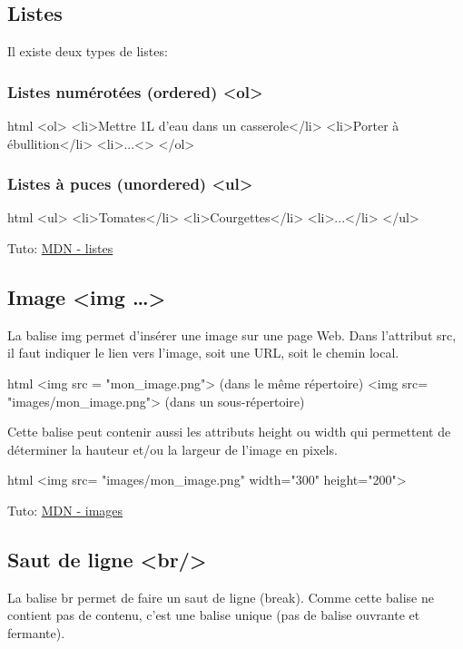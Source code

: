 \documentclass[a4paper,11pt]{article}
\begin{document}
\subsection{Listes}
Il existe deux types de listes:
\subsubsection{Listes numérotées (ordered) <ol>}
\begin{code}{html}
<ol>
  <li>Mettre 1L d'eau dans un casserole</li>
  <li>Porter à ébullition</li>
  <li>...<\li>
</ol>
\end{code}

\subsubsection{Listes à puces (unordered) <ul>}
\begin{code}{html}
<ul>
  <li>Tomates</li>
  <li>Courgettes</li>
  <li>...</li>
</ul>
\end{code}
Tuto: \href{https://developer.mozilla.org/fr/docs/Web/HTML/Element/li}{MDN - listes}

\subsection{Image <img \dots>}
La balise img permet d'insérer une image sur une page Web. Dans l'attribut src, il faut indiquer le lien vers l'image, soit une URL, soit le chemin local.
\begin{code}{html}
<img src = "mon_image.png"> (dans le même répertoire)
<img src= "images/mon_image.png"> (dans un sous-répertoire)
\end{code}
Cette balise peut contenir aussi les attributs height ou width qui permettent de déterminer la hauteur et/ou la largeur de l'image en pixels.
\begin{code}{html}
<img src= "images/mon_image.png" width="300" height="200">
\end{code}
Tuto: \href{https://developer.mozilla.org/fr/docs/Learn/HTML/Multimedia_and_embedding/Images_in_HTML}{MDN - images}

\subsection{Saut de ligne <br/>}
La balise br permet de faire un saut de ligne (break). Comme cette balise ne contient pas de contenu, c'est une balise unique (pas de balise ouvrante et fermante).
\end{document}
